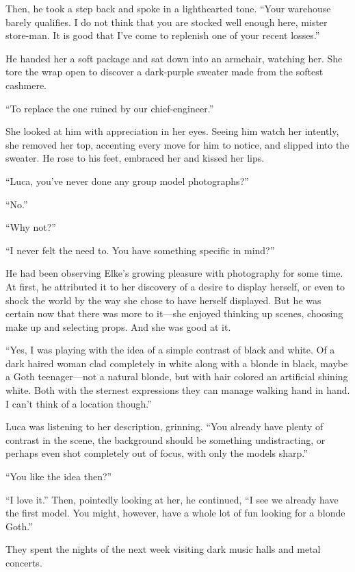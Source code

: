 Then, he took a step back and spoke in a lighthearted tone. ``Your warehouse barely qualifies. I do not think that you are stocked well enough here, mister store-man. It is good that I've come to replenish one of your recent losses.''

He handed her a soft package and sat down into an armchair, watching her. She tore the wrap open to discover a dark-purple sweater made from the softest cashmere.

``To replace the one ruined by our chief-engineer.''

She looked at him with appreciation in her eyes. Seeing him watch her intently, she removed her top, accenting every move for him to notice, and slipped into the sweater. He rose to his feet, embraced her and kissed her lips.

``Luca, you've never done any group model photographs?''

``No.''

``Why not?''

``I never felt the need to. You have something specific in mind?''

He had been observing Elke's growing pleasure with photography for some time. At first, he attributed it to her discovery of a desire to display herself, or even to shock the world by the way she chose to have herself displayed. But he was certain now that there was more to it---she enjoyed thinking up scenes, choosing make up and selecting props. And she was good at it.

``Yes, I was playing with the idea of a simple contrast of black and white. Of a dark haired woman clad completely in white along with a blonde in black, maybe a Goth teenager---not a natural blonde, but with hair colored an artificial shining white. Both with the sternest expressions they can manage walking hand in hand. I can't think of a location though.''

Luca was listening to her description, grinning. ``You already have plenty of contrast in the scene, the background should be something undistracting, or perhaps even shot completely out of focus, with only the models sharp.''

``You like the idea then?''

``I love it.'' Then, pointedly looking at her, he continued, ``I see we already have the first model. You might, however, have a whole lot of fun looking for a blonde Goth.''

\sectionline

They spent the nights of the next week visiting dark music halls and metal concerts.


